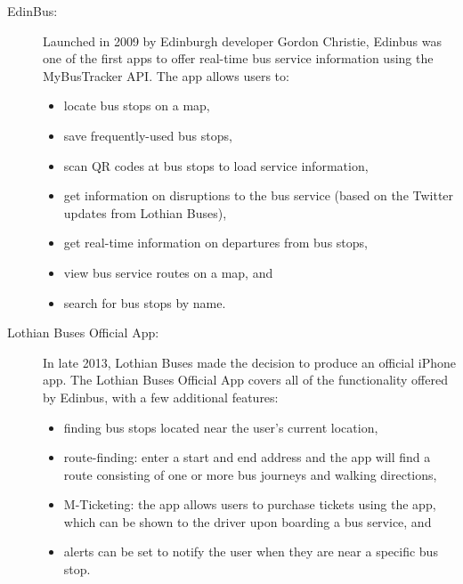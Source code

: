 \documentclass[10pt,twocolumn]{article}
\newcommand{\citep}[1]{}
\begin{document}
\begin{description}
\item[EdinBus:]
Launched in 2009 by Edinburgh developer Gordon Christie, Edinbus was one of the first apps to offer real-time bus service information using the MyBusTracker API\citep{edinbus}. The app allows users to:
\begin{itemize}
\item locate bus stops on a map,
\item save frequently-used bus stops,
\item scan QR codes at bus stops to load service information,
\item get information on disruptions to the bus service (based on the Twitter updates from Lothian Buses),
\item get real-time information on departures from bus stops,
\item view bus service routes on a map, and
\item search for bus stops by name.
\end{itemize}

\item[Lothian Buses Official App:]
In late 2013, Lothian Buses made the decision to produce an official iPhone app\citep{lothian}. The Lothian Buses Official App covers all of the functionality offered by Edinbus, with a few additional features:
\begin{itemize}
\item finding bus stops located near the user's current location,
\item route-finding: enter a start and end address and the app will find a route consisting of one or more bus journeys and walking directions,
\item M-Ticketing: the app allows users to purchase tickets using the app, which can be shown to the driver upon boarding a bus service, and 
\item alerts can be set to notify the user when they are near a specific bus stop.
\end{itemize}



\end{description}
\end{document}
